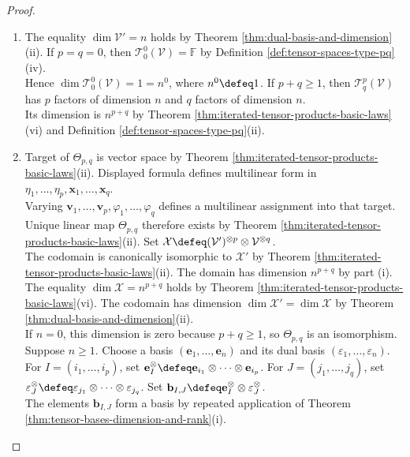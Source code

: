 \begin{proposition}
\begin{proof}
\begin{enumerate}[label=(\roman*)]
\item The equality $\dim\mathcal{V}'=n$ holds by Theorem \ref{thm:dual-basis-and-dimension}(ii). If $p=q=0$, then $\mathcal{T}^{0}_{0}(\mathcal{V})=\mathbb{F}$ by Definition \ref{def:tensor-spaces-type-pq}(iv).\\
Hence $\dim\mathcal{T}^{0}_{0}(\mathcal{V})=1=n^0$, where $n^0\defeq1$. If $p+q\geq1$, then $\mathcal{T}^{p}_{q}(\mathcal{V})$ has $p$ factors of dimension $n$ and $q$ factors of dimension $n$.\\
Its dimension is $n^{p+q}$ by Theorem \ref{thm:iterated-tensor-products-basic-laws}(vi) and Definition \ref{def:tensor-spaces-type-pq}(ii).
\item Target of $\Theta_{p,q}$ is vector space by Theorem \ref{thm:iterated-tensor-products-basic-laws}(ii). Displayed formula defines multilinear form in $\eta_1,\ldots,\eta_p,\mathbf{x}_1,\ldots,\mathbf{x}_q$.\\
Varying $\mathbf{v}_1,\ldots,\mathbf{v}_p,\varphi_1,\ldots,\varphi_q$ defines a multilinear assignment into that target.\\
Unique linear map $\Theta_{p,q}$ therefore exists by Theorem \ref{thm:iterated-tensor-products-basic-laws}(ii). Set $\mathcal{X}\defeq(\mathcal{V}')^{\otimes p}\otimes\mathcal{V}^{\otimes q}$.\\
The codomain is canonically isomorphic to $\mathcal{X}'$ by Theorem \ref{thm:iterated-tensor-products-basic-laws}(ii). The domain has dimension $n^{p+q}$ by part (i).\\
The equality $\dim\mathcal{X}=n^{p+q}$ holds by Theorem \ref{thm:iterated-tensor-products-basic-laws}(vi). The codomain has dimension $\dim\mathcal{X}'=\dim\mathcal{X}$ by Theorem \ref{thm:dual-basis-and-dimension}(ii).\\
If $n=0$, this dimension is zero because $p+q\geq1$, so $\Theta_{p,q}$ is an isomorphism.\\
Suppose $n\geq1$. Choose a basis $(\mathbf{e}_1,\ldots,\mathbf{e}_n)$ and its dual basis $(\varepsilon_1,\ldots,\varepsilon_n)$.\\
For $I=(i_1,\ldots,i_p)$, set $\mathbf{e}_I^{\otimes}\defeq\mathbf{e}_{i_1}\otimes\cdots\otimes\mathbf{e}_{i_p}$. For $J=(j_1,\ldots,j_q)$, set $\varepsilon_J^{\otimes}\defeq\varepsilon_{j_1}\otimes\cdots\otimes\varepsilon_{j_q}$. Set $\mathbf{b}_{I,J}\defeq\mathbf{e}_I^{\otimes}\otimes\varepsilon_J^{\otimes}$.\\
The elements $\mathbf{b}_{I,J}$ form a basis by repeated application of Theorem \ref{thm:tensor-bases-dimension-and-rank}(i).\\

\end{enumerate}
\end{proof}
\end{proposition}

